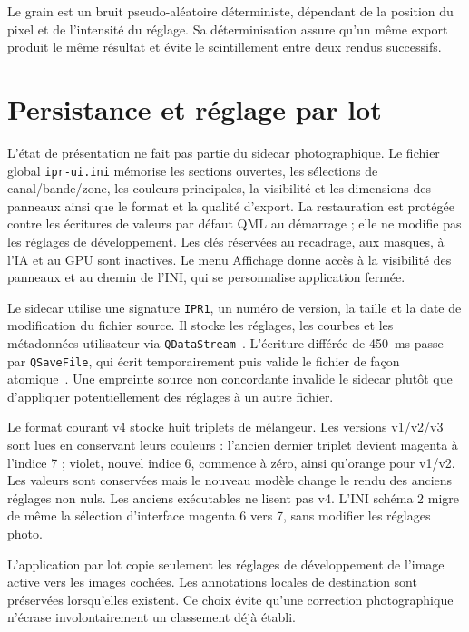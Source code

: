 Le grain est un bruit pseudo-aléatoire déterministe, dépendant de la position du pixel et de l'intensité du réglage. Sa déterminisation assure qu'un même export produit le même résultat et évite le scintillement entre deux rendus successifs.

\section{Persistance et réglage par lot}

L'état de présentation ne fait pas partie du sidecar photographique.
Le fichier global \texttt{ipr-ui.ini} mémorise les sections ouvertes, les
sélections de canal/bande/zone, les couleurs principales, la visibilité et les
dimensions des panneaux ainsi que le format et la qualité d'export. La
restauration est protégée contre les écritures de valeurs par défaut QML au
démarrage ; elle ne modifie pas les réglages de développement.
Les clés réservées au recadrage, aux masques, à l'IA et au GPU sont inactives.
Le menu Affichage donne accès à la visibilité des panneaux et au chemin de
l'INI, qui se personnalise application fermée.

Le sidecar utilise une signature \texttt{IPR1}, un numéro de version, la taille et la date de modification du fichier source. Il stocke les réglages, les courbes et les métadonnées utilisateur via \texttt{QDataStream}~\cite{qtQDataStream}. L'écriture différée de 450~ms passe par \texttt{QSaveFile}, qui écrit temporairement puis valide le fichier de façon atomique~\cite{qtQSaveFile}. Une empreinte source non concordante invalide le sidecar plutôt que d'appliquer potentiellement des réglages à un autre fichier.

Le format courant v4 stocke huit triplets de mélangeur. Les versions v1/v2/v3 sont lues en conservant leurs couleurs : l'ancien dernier triplet devient magenta à l'indice 7 ; violet, nouvel indice 6, commence à zéro, ainsi qu'orange pour v1/v2. Les valeurs sont conservées mais le nouveau modèle change le rendu des anciens réglages non nuls. Les anciens exécutables ne lisent pas v4. L'INI schéma 2 migre de même la sélection d'interface magenta 6 vers 7, sans modifier les réglages photo.

L'application par lot copie seulement les réglages de développement de l'image active vers les images cochées. Les annotations locales de destination sont préservées lorsqu'elles existent. Ce choix évite qu'une correction photographique n'écrase involontairement un classement déjà établi.
